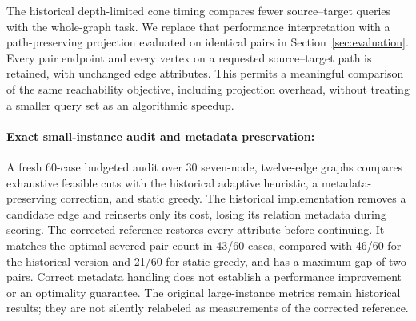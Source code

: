 The historical depth-limited cone timing compares fewer source--target queries with the whole-graph task. We replace that performance interpretation with a path-preserving projection evaluated on identical pairs in Section~\ref{sec:evaluation}. Every pair endpoint and every vertex on a requested source--target path is retained, with unchanged edge attributes. This permits a meaningful comparison of the same reachability objective, including projection overhead, without treating a smaller query set as an algorithmic speedup.

\paragraph{Exact small-instance audit and metadata preservation:}
A fresh 60-case budgeted audit over 30 seven-node, twelve-edge graphs compares exhaustive feasible cuts with the historical adaptive heuristic, a metadata-preserving correction, and static greedy. The historical implementation removes a candidate edge and reinserts only its cost, losing its relation metadata during scoring. The corrected reference restores every attribute before continuing. It matches the optimal severed-pair count in 43/60 cases, compared with 46/60 for the historical version and 21/60 for static greedy, and has a maximum gap of two pairs. Correct metadata handling does not establish a performance improvement or an optimality guarantee. The original large-instance metrics remain historical results; they are not silently relabeled as measurements of the corrected reference.
